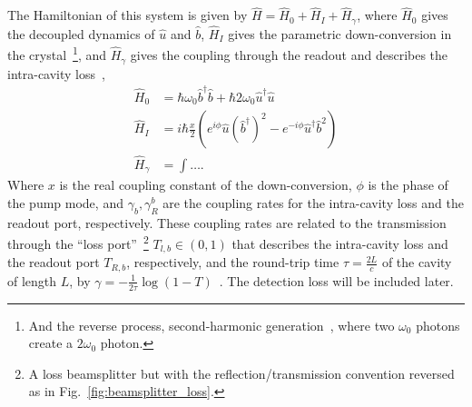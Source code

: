 The Hamiltonian of this system is given by $\hat H = \hat H_0 + \hat H_I + \hat H_\gamma$, where $\hat H_0$ gives the decoupled dynamics of $\hat u$ and $\hat b$, $\hat H_I$ gives the parametric down-conversion in the crystal~\footnote{And the reverse process, second-harmonic generation~\cite{}, where two $\omega_0$ photons create a $2\omega_0$ photon.}, and $\hat H_\gamma$ gives the coupling through the readout and describes the intra-cavity loss~\cite{}, 
\begin{align}
\hat H_0 &= \hbar \omega_0 \hat b^\dag \hat b + \hbar 2 \omega_0 \hat u^\dag \hat u\\
\hat H_I &= i \hbar \frac{x}{2} (e^{i\phi} \hat u (\hat b^\dag)^2 - e^{-i\phi} \hat u^\dag \hat b^2)\\
\hat H_\gamma &= \int \ldots .
\end{align}
Where $x$ is the real coupling constant of the down-conversion, $\phi$ is the phase of the pump mode, and $\gamma_b, \gamma^b_R$ are the coupling rates for the intra-cavity loss and the readout port, respectively. These coupling rates are related to the transmission through the ``loss port''~\footnote{A loss beamsplitter but with the reflection/transmission convention reversed~\cite{} as in Fig.~\ref{fig:beamsplitter_loss}.} $T_{l,b}\in(0,1)$ that describes the intra-cavity loss and the readout port $T_{R,b}$, respectively, and the round-trip time $\tau = \frac{2L}{c}$ of the cavity of length $L$, by $\gamma = -\frac{1}{2\tau}\log(1-T)$~\cite{}. The detection loss will be included later.

